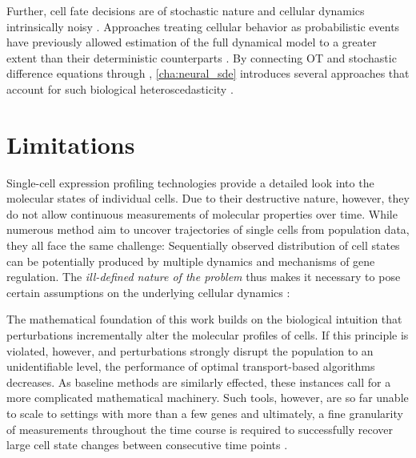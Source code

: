 Further, cell fate decisions are of stochastic nature and cellular dynamics intrinsically noisy \citep{wilkinson2009stochastic}.
Approaches treating cellular behavior as probabilistic events have previously allowed estimation of the full dynamical model to a greater extent than their deterministic counterparts \citep{bergen2020generalizing}.
By connecting OT and stochastic difference equations through , \cref{cha:neural_sde} introduces several approaches that account for such biological heteroscedasticity \citep{bunne2022recovering, somnath2023aligned}.

\section*{Limitations}

Single-cell expression profiling technologies provide a detailed look into the molecular states of individual cells. Due to their destructive nature, however, they do not allow continuous measurements of molecular properties over time. While numerous method aim to uncover trajectories of single cells from population data, they all face the same challenge: Sequentially observed distribution of cell states can be potentially produced by multiple dynamics and mechanisms of gene regulation. The \emph{ill-defined nature of the problem} thus makes it necessary to pose certain assumptions on the underlying cellular dynamics \citep{weinreb2018fundamental}:

The mathematical foundation of this work builds on the biological intuition that perturbations incrementally alter the molecular profiles of cells. 
If this principle is violated, however, and perturbations strongly disrupt the population to an unidentifiable level, the performance of optimal transport-based algorithms decreases. As baseline methods are similarly effected, these instances call for a more complicated mathematical machinery.
Such tools, however, are so far unable to scale to settings with more than a few genes \citep{heydari2022iqcell} and ultimately, a fine granularity of measurements throughout the time course is required to successfully recover large cell state changes between consecutive time points \citep{tritschler2019concepts}. \\

